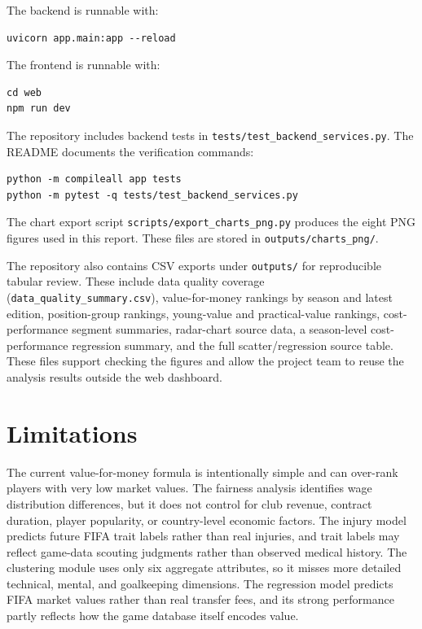 \documentclass[11pt,a4paper]{article}
\begin{document}
The backend is runnable with:

\begin{verbatim}
uvicorn app.main:app --reload
\end{verbatim}

The frontend is runnable with:

\begin{verbatim}
cd web
npm run dev
\end{verbatim}

The repository includes backend tests in \texttt{tests/test\_backend\_services.py}. The README documents the verification commands:

\begin{verbatim}
python -m compileall app tests
python -m pytest -q tests/test_backend_services.py
\end{verbatim}

The chart export script \texttt{scripts/export\_charts\_png.py} produces the eight PNG figures used in this report. These files are stored in \texttt{outputs/charts\_png/}.

The repository also contains CSV exports under \texttt{outputs/} for reproducible tabular review. These include data quality coverage (\texttt{data\_quality\_summary.csv}), value-for-money rankings by season and latest edition, position-group rankings, young-value and practical-value rankings, cost-performance segment summaries, radar-chart source data, a season-level cost-performance regression summary, and the full scatter/regression source table. These files support checking the figures and allow the project team to reuse the analysis results outside the web dashboard.

\section{Limitations}

The current value-for-money formula is intentionally simple and can over-rank players with very low market values. The fairness analysis identifies wage distribution differences, but it does not control for club revenue, contract duration, player popularity, or country-level economic factors. The injury model predicts future FIFA trait labels rather than real injuries, and trait labels may reflect game-data scouting judgments rather than observed medical history. The clustering module uses only six aggregate attributes, so it misses more detailed technical, mental, and goalkeeping dimensions. The regression model predicts FIFA market values rather than real transfer fees, and its strong performance partly reflects how the game database itself encodes value.
\end{document}
